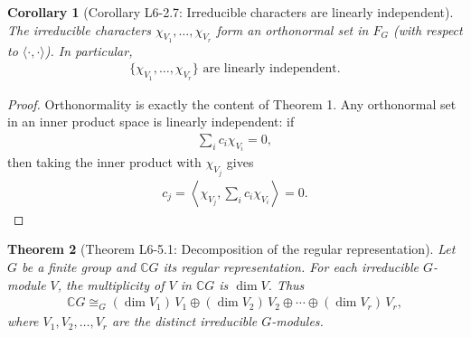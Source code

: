 \documentclass[titlepage]{article}
\theoremstyle{plain}
\newtheorem{theorem}{Theorem}[section]
\newtheorem{corollary}[theorem]{Corollary}
\theoremstyle{definition}
\theoremstyle{remark}
\theoremstyle{exercise-style}
\numberwithin{equation}{section}
\numberwithin{theorem}{section}
\numberwithin{remark}{section}
\begin{document}
\begin{myboxg}
    \begin{corollary}[Corollary L6-2.7: Irreducible characters are linearly independent]
        The irreducible characters $\chi_{V_1}, \dots, \chi_{V_r}$ form an orthonormal set in $F_G$ (with respect to $\langle \cdot, \cdot \rangle$). In particular,
        \begin{align}
            \{\chi_{V_1}, \dots, \chi_{V_r}\} \text{ are linearly independent.}
        \end{align}
    \end{corollary}
\end{myboxg}

\begin{proof}
    Orthonormality is exactly the content of Theorem 1. Any orthonormal set in an inner product space is linearly independent: if
    \begin{align}
        \sum_i c_i \chi_{V_i} = 0,
    \end{align}
    then taking the inner product with $\chi_{V_j}$ gives
    \begin{align}
        c_j = \left\langle \chi_{V_j}, \sum_i c_i \chi_{V_i} \right\rangle = 0.
    \end{align}
\end{proof}

\begin{myboxg}
    \begin{theorem}[Theorem L6-5.1: Decomposition of the regular representation]
        Let $G$ be a finite group and $\mathbb{C}G$ its regular representation. For each irreducible $G$-module $V$, the multiplicity of $V$ in $\mathbb{C}G$ is $\dim V$. Thus
        \begin{align}
            \mathbb{C}G \cong_G (\dim V_1)\,V_1 \oplus (\dim V_2)\,V_2 \oplus \cdots \oplus (\dim V_r)\,V_r,
        \end{align}
        where $V_1, V_2, \dots, V_r$ are the distinct irreducible $G$-modules.
    \end{theorem}
\end{myboxg}
\end{document}

